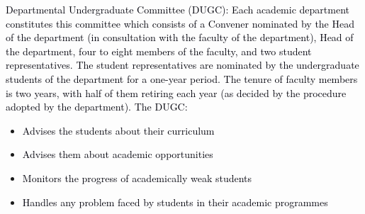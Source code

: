 \documentclass[12pt]{article}
\begin{document}
\vspace{\baselineskip}
\begin{justify}
{\fontsize{9pt}{10.8pt}\selectfont \textcolor[HTML]{00000A}{Departmental Undergraduate Committee (DUGC): Each academic department constitutes this committee which consists of a Convener nominated by the Head of the department (in consultation with the faculty of the department), Head of the department, four to eight members of the faculty, and two student representatives. The student representatives are nominated by the undergraduate students of the department for a one-year period. The tenure of faculty members is two years, with half of them retiring each year (as decided by the procedure adopted by the department). The DUGC:}\par}
\end{justify}\par

\begin{itemize}
	\item {\fontsize{10pt}{12.0pt}\selectfont \textcolor[HTML]{00000A}{Advises the students about their curriculum}\par}\par


\vspace{\baselineskip}
	\item {\fontsize{10pt}{12.0pt}\selectfont \textcolor[HTML]{00000A}{Advises them about academic opportunities}\par}\par


\vspace{\baselineskip}
	\item {\fontsize{10pt}{12.0pt}\selectfont \textcolor[HTML]{00000A}{Monitors the progress of academically weak students}\par}\par


\vspace{\baselineskip}
	\item {\fontsize{10pt}{12.0pt}\selectfont \textcolor[HTML]{00000A}{Handles any problem faced by students in their academic programmes}\par}
\end{itemize}\par
\end{document}
